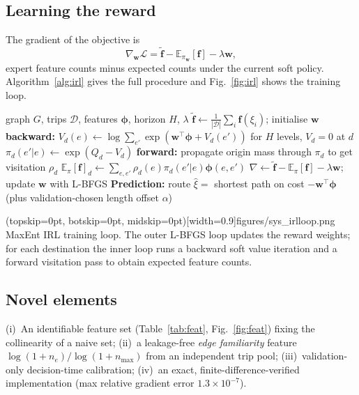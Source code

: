 \documentclass{ieeeaccess}
\newcommand{\bphi}{\boldsymbol{\phi}}
\newcommand{\bw}{\mathbf{w}}
\begin{document}
\subsection{Learning the reward}
The gradient of the objective is
\begin{equation}
\nabla_{\bw}\mathcal L=\tilde{\mathbf f}-\mathbb E_{\pi_{\bw}}[\mathbf f]-\lambda\bw,
\end{equation}
expert feature counts minus expected counts under the current soft policy. Algorithm~\ref{alg:irl} gives the full procedure and Fig.~\ref{fig:irl} shows the training loop.

\begin{algorithm}[t]
\caption{MaxEnt IRL on the road graph}\label{alg:irl}
\begin{algorithmic}[1]
\REQUIRE graph $G$, trips $\mathcal D$, features $\bphi$, horizon $H$, $\lambda$
\STATE $\tilde{\mathbf f}\gets\frac1{|\mathcal D|}\sum_i \mathbf f(\xi_i)$; initialise $\bw$
\REPEAT {}
    \STATE \textbf{backward:} $V_d(e)\gets\log\sum_{e'}\exp(\bw^\top\bphi+V_d(e'))$ for $H$ levels, $V_d=0$ at $d$
    \STATE $\pi_d(e'|e)\gets\exp(Q_d-V_d)$
    \STATE \textbf{forward:} propagate origin mass through $\pi_d$ to get visitation $\rho_d$
    \STATE $\mathbb E_{\pi}[\mathbf f]_d\gets\sum_{e,e'}\rho_d(e)\pi_d(e'|e)\bphi(e,e')$
  \ENDFOR
  \STATE $\nabla\gets\tilde{\mathbf f}-\mathbb E_\pi[\mathbf f]-\lambda\bw$; update $\bw$ with L-BFGS
\STATE \textbf{Prediction:} route $\hat\xi=$ shortest path on cost $-\bw^\top\bphi$ (plus validation-chosen length offset $\alpha$)
\end{algorithmic}
\end{algorithm}

\Figure[t!](topskip=0pt, botskip=0pt, midskip=0pt)[width=0.9\textwidth]{figures/sys_irlloop.png}
{MaxEnt IRL training loop. The outer L-BFGS loop updates the reward weights; for each destination the inner loop runs a backward soft value iteration and a forward visitation pass to obtain expected feature counts.\label{fig:irl}}


\subsection{Novel elements}
(i)~An identifiable feature set (Table~\ref{tab:feat}, Fig.~\ref{fig:feat}) fixing the collinearity of a naive set; (ii)~a leakage-free \emph{edge familiarity} feature $\log(1{+}n_e)/\log(1{+}n_{\max})$ from an independent trip pool; (iii)~validation-only decision-time calibration; (iv)~an exact, finite-difference-verified implementation (max relative gradient error $1.3\times10^{-7}$).
\end{document}
